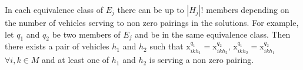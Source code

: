 \begin{enumerate}
  In each equivalence class of $E_j$ there can be up to $|H_j|!$ members depending
  on the number of vehicles serving to non zero pairings in the solutions. 
  For example, let $q_1$ and $q_2$ be two members of $E_j$ and be in
  the same equivalence class. Then there exists a pair of vehicles $h_1$ and
  $h_2$ such that $\mbox{x}^{q_1}_{ikh_1} =\mbox{x}^{q_2}_{ikh_2}$, 
  $\mbox{x}^{q_1}_{ikh_2} =\mbox{x}^{q_2}_{ikh_1}$ $\forall i, k \in M$ and 
  at least one of $h_1$ and $h_2$ is serving a non zero pairing.
  


\end{enumerate}

